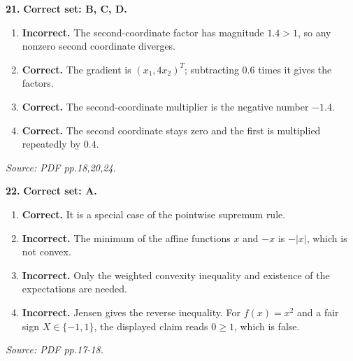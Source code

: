 \documentclass[11pt,a4paper]{article}
\begin{document}
\par\noindent\begin{minipage}{\linewidth}
\textbf{21.} \textbf{Correct set: B, C, D.}
\begin{enumerate}[label=(\Alph*),leftmargin=8mm,itemsep=2pt,topsep=2pt]
\item \textbf{Incorrect.} The second-coordinate factor has magnitude \(1.4>1\), so any nonzero second coordinate diverges.
\item \textbf{Correct.} The gradient is \((x_1,4x_2)^T\); subtracting \(0.6\) times it gives the factors.
\item \textbf{Correct.} The second-coordinate multiplier is the negative number \(-1.4\).
\item \textbf{Correct.} The second coordinate stays zero and the first is multiplied repeatedly by \(0.4\).
\end{enumerate}
{\footnotesize\textit{Source: PDF pp.18,20,24.}}

\end{minipage}\par\vspace{3mm}
\par\noindent\begin{minipage}{\linewidth}
\textbf{22.} \textbf{Correct set: A.}
\begin{enumerate}[label=(\Alph*),leftmargin=8mm,itemsep=2pt,topsep=2pt]
\item \textbf{Correct.} It is a special case of the pointwise supremum rule.
\item \textbf{Incorrect.} The minimum of the affine functions \(x\) and \(-x\) is \(-|x|\), which is not convex.
\item \textbf{Incorrect.} Only the weighted convexity inequality and existence of the expectations are needed.
\item \textbf{Incorrect.} Jensen gives the reverse inequality. For \(f(x)=x^2\) and a fair sign \(X\in\{-1,1\}\), the displayed claim reads \(0\ge1\), which is false.
\end{enumerate}
{\footnotesize\textit{Source: PDF pp.17-18.}}

\end{minipage}\par\vspace{3mm}
\end{document}
